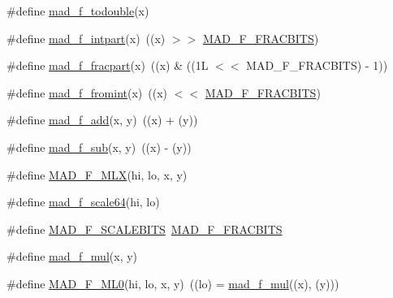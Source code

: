 \begin{DoxyCompactItemize}
\item 
\#define \hyperlink{mac_2config_2i386_2lib-src_2libmad_2mad_8h_ab89fbb463a905be3b71c39d148626d9c}{mad\+\_\+f\+\_\+todouble}(x)
\item 
\#define \hyperlink{mac_2config_2i386_2lib-src_2libmad_2mad_8h_aa850442e41ebbdf423afc558e02f26fc}{mad\+\_\+f\+\_\+intpart}(x)~((x) $>$$>$ \hyperlink{mac_2config_2i386_2lib-src_2libmad_2mad_8h_afe9f395501b4973ab536c13fb8235944}{M\+A\+D\+\_\+\+F\+\_\+\+F\+R\+A\+C\+B\+I\+TS})
\item 
\#define \hyperlink{mac_2config_2i386_2lib-src_2libmad_2mad_8h_adb451b6d7dd6c047fbdf93a2a95d1021}{mad\+\_\+f\+\_\+fracpart}(x)~((x) \& ((1\+L $<$$<$ M\+A\+D\+\_\+\+F\+\_\+\+F\+R\+A\+C\+B\+I\+T\+S) -\/ 1))
\item 
\#define \hyperlink{mac_2config_2i386_2lib-src_2libmad_2mad_8h_a4be984ff1bc37a93928705089668ee71}{mad\+\_\+f\+\_\+fromint}(x)~((x) $<$$<$ \hyperlink{mac_2config_2i386_2lib-src_2libmad_2mad_8h_afe9f395501b4973ab536c13fb8235944}{M\+A\+D\+\_\+\+F\+\_\+\+F\+R\+A\+C\+B\+I\+TS})
\item 
\#define \hyperlink{mac_2config_2i386_2lib-src_2libmad_2mad_8h_aa39dad203617307f6d641f797516d871}{mad\+\_\+f\+\_\+add}(x,  y)~((x) + (y))
\item 
\#define \hyperlink{mac_2config_2i386_2lib-src_2libmad_2mad_8h_a3836b9f2d266932db1192c4c5195298c}{mad\+\_\+f\+\_\+sub}(x,  y)~((x) -\/ (y))
\item 
\#define \hyperlink{mac_2config_2i386_2lib-src_2libmad_2mad_8h_a32e96014bff64372e6ddda6449d2862a}{M\+A\+D\+\_\+\+F\+\_\+\+M\+LX}(hi,  lo,  x,  y)
\item 
\#define \hyperlink{mac_2config_2i386_2lib-src_2libmad_2mad_8h_a836fb7fa861debac4b5fb4b1013ff309}{mad\+\_\+f\+\_\+scale64}(hi,  lo)
\item 
\#define \hyperlink{mac_2config_2i386_2lib-src_2libmad_2mad_8h_aa0356c356ceced040bed036d0b4a2b2e}{M\+A\+D\+\_\+\+F\+\_\+\+S\+C\+A\+L\+E\+B\+I\+TS}~\hyperlink{mac_2config_2i386_2lib-src_2libmad_2mad_8h_afe9f395501b4973ab536c13fb8235944}{M\+A\+D\+\_\+\+F\+\_\+\+F\+R\+A\+C\+B\+I\+TS}
\item 
\#define \hyperlink{mac_2config_2i386_2lib-src_2libmad_2mad_8h_ac424f0a810aae505036e63103f4a25af}{mad\+\_\+f\+\_\+mul}(x,  y)
\item 
\#define \hyperlink{mac_2config_2i386_2lib-src_2libmad_2mad_8h_ad700e5599dd11accc3128356e2d975e8}{M\+A\+D\+\_\+\+F\+\_\+\+M\+L0}(hi,  lo,  x,  y)~((lo)  = \hyperlink{mac_2config_2i386_2lib-src_2libmad_2mad_8h_ac424f0a810aae505036e63103f4a25af}{mad\+\_\+f\+\_\+mul}((x), (y)))
$$
\end{DoxyCompactItemize}
